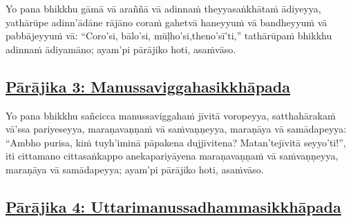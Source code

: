 Yo pana bhikkhu gāmā vā araññā vā adinnaṁ theyyasaṅkhātaṁ ādiyeyya, yathārūpe adinn'ādāne rājāno coraṁ gahetvā haneyyuṁ vā bandheyyuṁ vā pabbājeyyuṁ vā: ``Coro'si, bālo'si, mūḷho'si,\makeatletter\hyperlink{endnote31-appendix}\makeatother \thinspace theno'sī'ti,'' tathārūpaṁ bhikkhu adinnaṁ ādiyamāno; ayam'pi pārājiko hoti, asaṁvāso.



\subsection*{\hyperref[disq3]{Pārājika 3: Manussaviggahasikkhāpada}}
\label{par3}

Yo pana bhikkhu sañcicca manussaviggahaṁ jīvitā voropeyya, satthahārakaṁ vā'ssa pariyeseyya, maraṇavaṇṇaṁ vā saṁvaṇṇeyya, maraṇāya vā samādapeyya: ``Ambho purisa, kiṁ tuyh'iminā pāpakena dujjīvitena? Matan'te\makeatletter\hyperlink{endnote-appendix}\makeatother \thinspace jīvitā seyyo'ti!'', iti cittamano cittasaṅkappo anekapariyāyena maraṇavaṇṇaṁ vā saṁvaṇṇeyya, maraṇāya vā samādapeyya; ayam'pi pārājiko hoti, asaṁvāso.



\subsection*{\hyperref[disq4]{Pārājika 4: Uttarimanussadhammasikkhāpada}}

\label{par4}


